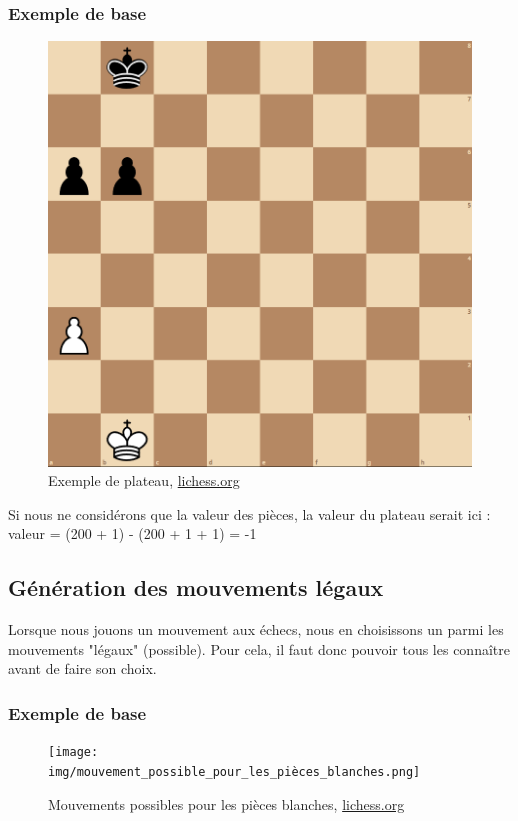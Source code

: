 \huge\documentclass{article}
\begin{document}
\subsubsection{Exemple de base}
\begin{figure}[h]
\centering
\includegraphics[scale=0.25]{img/base_heuristic.png}
\caption{Exemple de plateau, 
\href{https://lichess.org/editor/}{lichess.org}}
\end{figure}
Si nous ne considérons que la valeur des pièces, la valeur du plateau serait ici : \newline
valeur = (200 + 1) - (200 + 1 + 1) = -1 
\subsection{Génération des mouvements légaux}\label{legal_move_1.4}
Lorsque nous jouons un mouvement aux échecs, nous en choisissons un parmi les mouvements "légaux" (possible). Pour cela, il faut donc pouvoir tous les connaître avant de faire son choix.
\subsubsection{Exemple de base}
    \begin{figure}[h]
    \centering
    \texttt{[image: img/mouvement\_possible\_pour\_les\_pièces\_blanches.png]}
    \caption{Mouvements possibles pour les pièces blanches, \href{https://lichess.org/editor/7k/8/8/8/2R1P3/8/8/6K1_w_-_-_0_1}{lichess.org}}
    \end{figure}
\newpage
\end{document}
